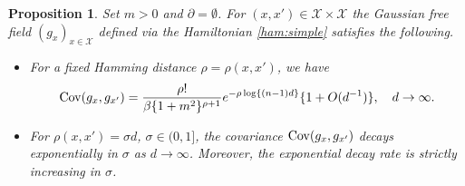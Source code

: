 \documentclass[a4paper,11pt]{article}
\theoremstyle{plain}
\newtheorem{proposition}[theorem]{Proposition}
\theoremstyle{definition}
\begin{document}
\begin{proposition}\label{prop:simp:lim}
  Set $m>0$ and $\partial=\emptyset$.
  For $(x,x')\in\mathcal{X}\times\mathcal{X}$
  the Gaussian free field $(g_x)_{x\in\mathcal{X}}$
  defined via the Hamiltonian \eqref{ham:simple}
  satisfies the following.
  \begin{itemize}
  \item[(i)]
  For a fixed Hamming distance $\rho=\rho(x,x')$, we have
  \[
    {\rm Cov}(g_x,g_{x'})
    =\frac{\rho!}{\beta\{1+m^2\}^{\rho+1}}
    e^{-\rho\log \{(n-1)d\}}\{1+O(d^{-1})\},
    \quad d\to\infty.
  \]
  \item[(ii)]
    For $\rho(x,x')=\sigma d$, $\sigma\in(0,1]$, the covariance
    ${\rm Cov}(g_x,g_{x'})$ decays exponentially in $\sigma$
    as $d\to\infty$. Moreover, the exponential decay rate is
    strictly increasing in $\sigma$.
  \end{itemize}
\end{proposition}
\end{document}
